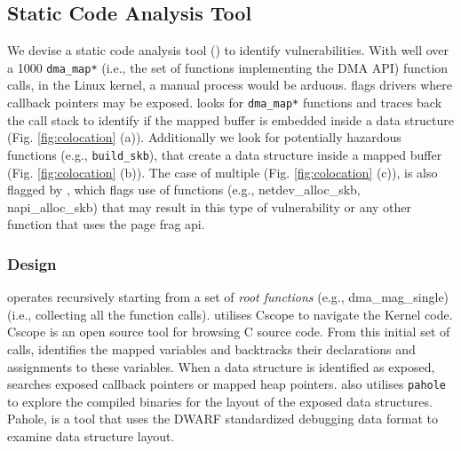 \subsection{Static Code Analysis Tool}\label{sec:static-analysis}

We devise a static code analysis tool (\tool) to identify \subpage vulnerabilities. With well over a 1000 \texttt{dma\_map*} (i.e., the set of functions implementing the DMA API) function calls, in the Linux kernel, a manual process would be arduous. \tool flags drivers where callback pointers may be exposed. \tool looks for \texttt{dma\_map*} functions and traces back the call stack to identify if the mapped buffer is embedded inside a data structure (Fig. \ref{fig:colocation} (a)). Additionally we look for potentially hazardous functions (e.g., \texttt{build\_skb}), that create a data structure inside a mapped buffer (Fig. \ref{fig:colocation} (b)). 
The case of multiple \iova{} (Fig. \ref{fig:colocation} (c)), is also flagged by \tool, which flags use of functions (e.g., netdev\_alloc\_skb, napi\_alloc\_skb) that may result in this type of vulnerability or any other function that uses the page frag api. 




\subsubsection{Design}
\tool operates recursively starting from a set of \textit{root functions} (e.g., dma\_mag\_single) (i.e., collecting all the function calls). \tool utilises Cscope \cite{cscope,cscope_92} to navigate the Kernel code. Cscope is an open source tool for browsing C source code. From this initial set of calls, \tool identifies the mapped variables and backtracks their declarations and assignments to these variables. When a data structure is identified as exposed, \tool searches
exposed callback pointers or mapped heap pointers. \tool also utilises \texttt{pahole} \cite{dwarves} to explore the compiled binaries for the layout of the exposed data structures. Pahole, is a tool that uses the DWARF \cite{dwarf} standardized debugging data format to examine data structure layout.

